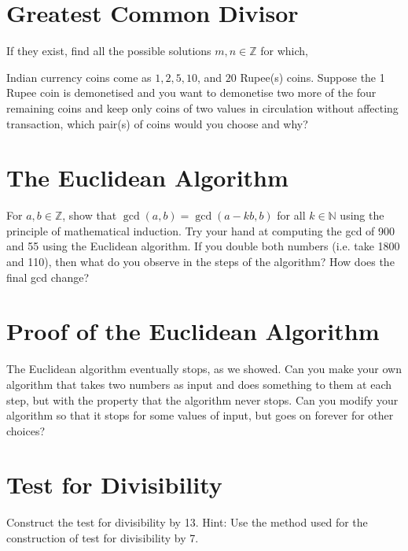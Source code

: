 \documentclass[12pt]{exam}
\begin{document}
\section{Greatest Common Divisor}
\begin{questions}
\question If they exist, find all the possible solutions $m, n \in \mathbb{Z}$ for which,
\question Indian currency coins come as $1, 2, 5, 10$, and $20$ Rupee(s) coins. Suppose the 1 Rupee coin is demonetised and you want to demonetise two more of the four remaining coins and keep only coins of two values in circulation without affecting transaction, which pair(s) of coins would you choose and why? 
\end{questions}

\section{The Euclidean Algorithm}
\begin{questions}
    \question For $a, b \in \mathbb{Z}$, show that $\gcd(a, b) = \gcd(a - kb, b)$ for all $k \in \mathbb{N}$ using the principle of mathematical induction.
    \question Try your hand at computing the gcd of 900 and 55 using the Euclidean algorithm.
    \question If you double both numbers (i.e. take 1800 and 110), then what do you observe in the steps of the algorithm? How does the final gcd change?
\end{questions}
\section{Proof of the Euclidean Algorithm}
\begin{questions}
    \question The Euclidean algorithm eventually stops, as we showed. Can you make your own algorithm that takes two numbers as input and does something to them at each step, but with the property that the algorithm never stops.
    \question Can you modify your algorithm so that it stops for some values of input, but goes on forever for other choices?
\end{questions}

\section{Test for Divisibility}
\begin{questions}
        \question Construct the test for divisibility by 13. Hint: Use the method used for the construction of test for divisibility by 7.
\end{questions}
\end{document}
